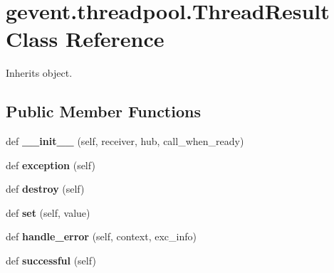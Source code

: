 \hypertarget{classgevent_1_1threadpool_1_1_thread_result}{}\section{gevent.\+threadpool.\+Thread\+Result Class Reference}
\label{classgevent_1_1threadpool_1_1_thread_result}


Inherits object.

\subsection*{Public Member Functions}
\begin{DoxyCompactItemize}
\item 
\mbox{\label{classgevent_1_1threadpool_1_1_thread_result_ade05048e71a83a389a83fb350baefb0e}} 
def {\bfseries \+\_\+\+\_\+init\+\_\+\+\_\+} (self, receiver, hub, call\+\_\+when\+\_\+ready)
\item 
\mbox{\label{classgevent_1_1threadpool_1_1_thread_result_a2980fb06d66605c22ef6d6cce2e45898}} 
def {\bfseries exception} (self)
\item 
\mbox{\label{classgevent_1_1threadpool_1_1_thread_result_aa59732ead3c36ee84849b1cf1364cc54}} 
def {\bfseries destroy} (self)
\item 
\mbox{\label{classgevent_1_1threadpool_1_1_thread_result_aeb59aa72b8cb9572925cfad89a0f407b}} 
def {\bfseries set} (self, value)
\item 
\mbox{\label{classgevent_1_1threadpool_1_1_thread_result_ad3c1eccb14ea76a4bfac71b1b5706081}} 
def {\bfseries handle\+\_\+error} (self, context, exc\+\_\+info)
\item 
\mbox{\label{classgevent_1_1threadpool_1_1_thread_result_a79bcf43ee198aadaa3ddf9b1d49d33bc}} 
def {\bfseries successful} (self)
\end{DoxyCompactItemize}
